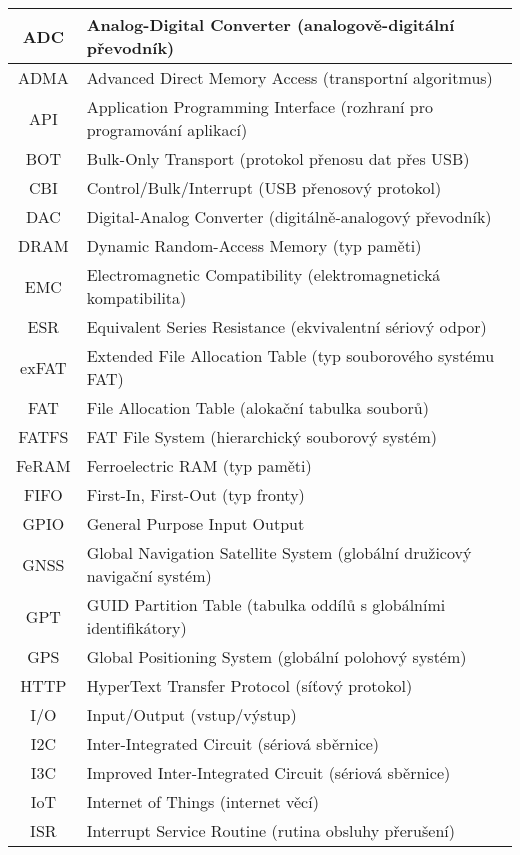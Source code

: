 \begin{longtable}{|c|p{12cm}|}
ADC     & Analog-Digital Converter (analogově-digitální převodník) \\ \hline
ADMA    & Advanced Direct Memory Access (transportní algoritmus) \\ \hline
API     & Application Programming Interface (rozhraní pro programování aplikací) \\ \hline
BOT     & Bulk-Only Transport (protokol přenosu dat přes USB) \\ \hline
CBI     & Control/Bulk/Interrupt (USB přenosový protokol) \\ \hline
DAC     & Digital-Analog Converter (digitálně-analogový převodník) \\ \hline
DRAM    & Dynamic Random-Access Memory (typ paměti) \\ \hline
EMC     & Electromagnetic Compatibility (elektromagnetická kompatibilita) \\ \hline
ESR     & Equivalent Series Resistance (ekvivalentní sériový odpor) \\ \hline
exFAT   & Extended File Allocation Table (typ souborového systému FAT) \\ \hline
FAT     & File Allocation Table (alokační tabulka souborů) \\ \hline
FATFS   & FAT File System (hierarchický souborový systém) \\ \hline
FeRAM   & Ferroelectric RAM (typ paměti) \\ \hline
FIFO    & First-In, First-Out (typ fronty) \\ \hline
GPIO    & General Purpose Input Output \\ \hline
GNSS    & Global Navigation Satellite System (globální družicový navigační systém) \\ \hline
GPT     & GUID Partition Table (tabulka oddílů s globálními identifikátory) \\ \hline
GPS     & Global Positioning System (globální polohový systém) \\ \hline
HTTP    & HyperText Transfer Protocol (síťový protokol) \\ \hline
I/O     & Input/Output (vstup/výstup) \\ \hline
I2C     & Inter-Integrated Circuit (sériová sběrnice) \\ \hline
I3C     & Improved Inter-Integrated Circuit (sériová sběrnice) \\ \hline
IoT     & Internet of Things (internet věcí) \\ \hline
ISR     & Interrupt Service Routine (rutina obsluhy přerušení) \\ \hline

\end{longtable}
